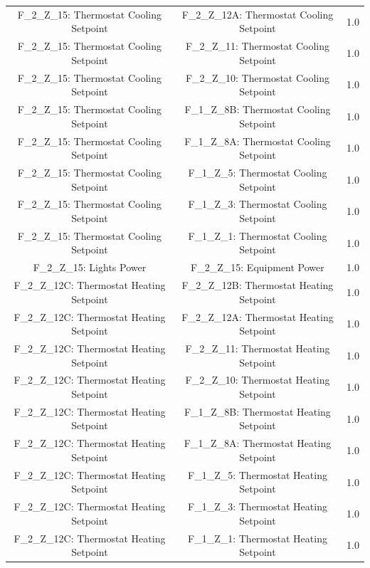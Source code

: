 \documentclass[aps, 10pt, a4paper]{article}
\begin{document}
\begin{longtable}{c|c||c}
                    F\_2\_Z\_15: Thermostat Cooling Setpoint & F\_2\_Z\_12A: Thermostat Cooling Setpoint & 1.0 \\
                    F\_2\_Z\_15: Thermostat Cooling Setpoint & F\_2\_Z\_11: Thermostat Cooling Setpoint & 1.0 \\
                    F\_2\_Z\_15: Thermostat Cooling Setpoint & F\_2\_Z\_10: Thermostat Cooling Setpoint & 1.0 \\
                    F\_2\_Z\_15: Thermostat Cooling Setpoint & F\_1\_Z\_8B: Thermostat Cooling Setpoint & 1.0 \\
                    F\_2\_Z\_15: Thermostat Cooling Setpoint & F\_1\_Z\_8A: Thermostat Cooling Setpoint & 1.0 \\
                    F\_2\_Z\_15: Thermostat Cooling Setpoint & F\_1\_Z\_5: Thermostat Cooling Setpoint & 1.0 \\
                    F\_2\_Z\_15: Thermostat Cooling Setpoint & F\_1\_Z\_3: Thermostat Cooling Setpoint & 1.0 \\
                    F\_2\_Z\_15: Thermostat Cooling Setpoint & F\_1\_Z\_1: Thermostat Cooling Setpoint & 1.0 \\
                    F\_2\_Z\_15: Lights Power & F\_2\_Z\_15: Equipment Power & 1.0 \\
                    F\_2\_Z\_12C: Thermostat Heating Setpoint & F\_2\_Z\_12B: Thermostat Heating Setpoint & 1.0 \\
                    F\_2\_Z\_12C: Thermostat Heating Setpoint & F\_2\_Z\_12A: Thermostat Heating Setpoint & 1.0 \\
                    F\_2\_Z\_12C: Thermostat Heating Setpoint & F\_2\_Z\_11: Thermostat Heating Setpoint & 1.0 \\
                    F\_2\_Z\_12C: Thermostat Heating Setpoint & F\_2\_Z\_10: Thermostat Heating Setpoint & 1.0 \\
                    F\_2\_Z\_12C: Thermostat Heating Setpoint & F\_1\_Z\_8B: Thermostat Heating Setpoint & 1.0 \\
                    F\_2\_Z\_12C: Thermostat Heating Setpoint & F\_1\_Z\_8A: Thermostat Heating Setpoint & 1.0 \\
                    F\_2\_Z\_12C: Thermostat Heating Setpoint & F\_1\_Z\_5: Thermostat Heating Setpoint & 1.0 \\
                    F\_2\_Z\_12C: Thermostat Heating Setpoint & F\_1\_Z\_3: Thermostat Heating Setpoint & 1.0 \\
                    F\_2\_Z\_12C: Thermostat Heating Setpoint & F\_1\_Z\_1: Thermostat Heating Setpoint & 1.0 \\

\end{longtable}
\end{document}

